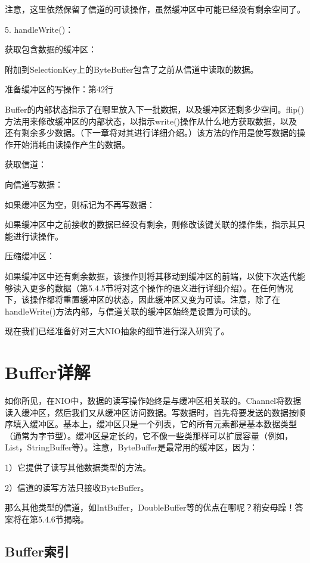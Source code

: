 	注意，这里依然保留了信道的可读操作，虽然缓冲区中可能已经没有剩余空间了。 

	5. handleWrite()：

	获取包含数据的缓冲区：

	附加到SelectionKey上的ByteBuffer包含了之前从信道中读取的数据。 

	准备缓冲区的写操作：第42行 

	Buffer的内部状态指示了在哪里放入下一批数据，以及缓冲区还剩多少空间。flip()方法用来修改缓冲区的内部状态，以指示write()操作从什么地方获取数据，以及还有剩余多少数据。（下一章将对其进行详细介绍。）该方法的作用是使写数据的操作开始消耗由读操作产生的数据。 

	获取信道：

	向信道写数据：

	如果缓冲区为空，则标记为不再写数据：

	如果缓冲区中之前接收的数据已经没有剩余，则修改该键关联的操作集，指示其只能进行读操作。 

	压缩缓冲区：

	如果缓冲区中还有剩余数据，该操作则将其移动到缓冲区的前端，以使下次迭代能够读入更多的数据（第5.4.5节将对这个操作的语义进行详细介绍）。在任何情况下，该操作都将重置缓冲区的状态，因此缓冲区又变为可读。注意，除了在handleWrite()方法内部，与信道关联的缓冲区始终是设置为可读的。 

	现在我们已经准备好对三大NIO抽象的细节进行深入研究了。 

\section{Buffer详解}

	如你所见，在NIO中，数据的读写操作始终是与缓冲区相关联的。Channel将数据读入缓冲区，然后我们又从缓冲区访问数据。写数据时，首先将要发送的数据按顺序填入缓冲区。基本上，缓冲区只是一个列表，它的所有元素都是基本数据类型（通常为字节型）。缓冲区是定长的，它不像一些类那样可以扩展容量（例如，List，StringBuffer等）。注意，ByteBuffer是最常用的缓冲区，因为：

	1）它提供了读写其他数据类型的方法。

	2）信道的读写方法只接收ByteBuffer。

	那么其他类型的信道，如IntBuffer，DoubleBuffer等的优点在哪呢？稍安毋躁！答案将在第5.4.6节揭晓。 


	\subsection{Buffer索引}


